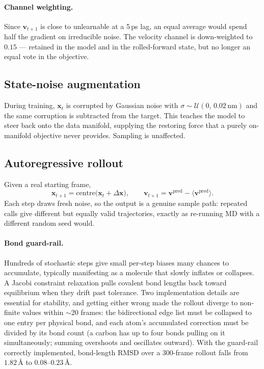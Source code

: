 \documentclass[11pt,a4paper]{article}
\begin{document}
\paragraph{Channel weighting.} Since $\mathbf{v}_{t+1}$ is close to unlearnable
at a 5\,ps lag, an equal average would spend half the gradient on irreducible
noise. The velocity channel is down-weighted to $0.15$ --- retained in the
model and in the rolled-forward state, but no longer an equal vote in the
objective.

\subsection{State-noise augmentation}
During training, $\mathbf{x}_t$ is corrupted by Gaussian noise with
$\sigma \sim \mathcal{U}(0,\,0.02\,\text{nm})$ and the same corruption is
subtracted from the target. This teaches the model to steer back onto the data
manifold, supplying the restoring force that a purely on-manifold objective
never provides. Sampling is unaffected.

\subsection{Autoregressive rollout}
Given a real starting frame,
\[
\mathbf{x}_{t+1} = \mathrm{centre}\big(\mathbf{x}_t + \Delta\mathbf{x}\big),
\qquad
\mathbf{v}_{t+1} = \mathbf{v}^{\text{pred}} - \langle \mathbf{v}^{\text{pred}}\rangle .
\]
Each step draws fresh noise, so the output is a genuine sample path: repeated
calls give different but equally valid trajectories, exactly as re-running MD
with a different random seed would.

\paragraph{Bond guard-rail.} Hundreds of stochastic steps give small per-step
biases many chances to accumulate, typically manifesting as a molecule that
slowly inflates or collapses. A Jacobi constraint relaxation pulls covalent
bond lengths back toward equilibrium when they drift past tolerance. Two
implementation details are essential for stability, and getting either wrong
made the rollout diverge to non-finite values within $\sim$20 frames:
the bidirectional edge list must be collapsed to one entry per physical bond,
and each atom's accumulated correction must be divided by its bond count
(a carbon has up to four bonds pulling on it simultaneously; summing
overshoots and oscillates outward). With the guard-rail correctly implemented,
bond-length RMSD over a 300-frame rollout falls from $1.82$\,\AA{} to
$0.08$--$0.23$\,\AA.
\end{document}
